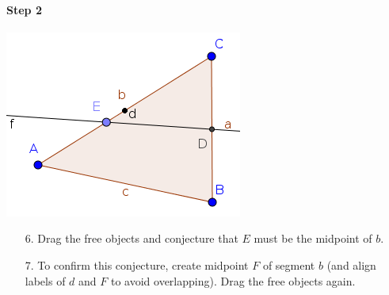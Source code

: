 \documentclass{article}
\begin{document}
\paragraph{Step 2}
\begin{center}
\includegraphics[scale=0.5]{classroom2}
\end{center}
\begin{enumerate}
    \item[6.] Drag the free objects and conjecture that $E$ must be the midpoint of $b$.
    \item[7.] To confirm this conjecture, create midpoint $F$ of segment $b$ (and align labels of $d$ and $F$ to avoid overlapping). Drag the free objects again.
\end{enumerate}
\end{document}
